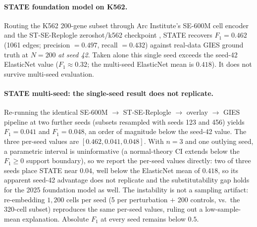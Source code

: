 \documentclass{article}
\theoremstyle{plain}
\theoremstyle{definition}
\theoremstyle{remark}
\begin{document}
\paragraph{STATE foundation model on K562.}
Routing the K562 200-gene subset through Arc Institute's SE-600M cell encoder and the ST-SE-Replogle zeroshot/k562 checkpoint \citep{arc2025state}, STATE recovers $F_1 = 0.462$ (1061 edges; precision $= 0.497$, recall $= 0.432$) against real-data GIES ground truth at $N{=}200$ \emph{at seed 42}. Taken alone this single seed exceeds the seed-42 ElasticNet value ($F_1 \approx 0.32$; the multi-seed ElasticNet mean is $0.418$). It does not survive multi-seed evaluation.

\paragraph{STATE multi-seed: the single-seed result does not replicate.}
\label{sec:state-multi-seed}
Re-running the identical SE-600M $\to$ ST-SE-Replogle $\to$ overlay $\to$ GIES pipeline at two further seeds (subsets resampled with seeds 123 and 456) yields $F_1 = 0.041$ and $F_1 = 0.048$, an order of magnitude below the seed-42 value. The three per-seed values are $[0.462, 0.041, 0.048]$. With $n=3$ and one outlying seed, a parametric interval is uninformative (a normal-theory CI extends below the $F_1{\geq}0$ support boundary), so we report the per-seed values directly: two of three seeds place STATE near $0.04$, well below the ElasticNet mean of $0.418$, so its apparent seed-42 advantage does not replicate and the substitutability gap holds for the 2025 foundation model as well. The instability is not a sampling artifact: re-embedding $1{,}200$ cells per seed (5 per perturbation $+$ 200 controls, vs.\ the 320-cell subset) reproduces the same per-seed values, ruling out a low-sample-mean explanation. Absolute $F_1$ at every seed remains below $0.5$.
\end{document}
